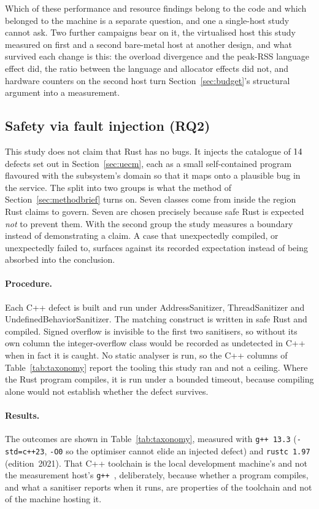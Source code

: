 \documentclass[english,oneside,a4paper,censored,csm,software-track-2020]{HYthesisML}
\begin{document}
Which of these performance and resource findings belong to the code and which belonged to the
machine is a separate question, and one a single-host study cannot ask.
Two further campaigns bear on it, the virtualised host this study measured on first and a second
bare-metal host at another design, and what survived each change is this: the overload divergence
and the peak-RSS language effect did, the ratio between the language and allocator effects did
not, and hardware counters on the second host turn Section~\ref{sec:budget}'s structural argument
into a measurement.

\subsection{Safety via fault injection (RQ2)}\label{sec:safetyresults}
This study does not claim that Rust has no bugs. It injects the catalogue of $14$
defects set out in Section~\ref{sec:uecm}, each as a small self-contained program flavoured
with the subsystem's domain so that it maps onto a plausible bug in the service. The split into
two groups is what the method of Section~\ref{sec:methodbrief} turns on. Seven classes come from
inside the region Rust claims to govern. Seven are chosen precisely because safe Rust is expected
\emph{not} to prevent them. With the second group the study measures a boundary instead of
demonstrating a claim. A case that unexpectedly compiled, or unexpectedly failed to, surfaces
against its recorded expectation instead of being absorbed into the conclusion.

\paragraph{Procedure.}
Each C++ defect is built and run under AddressSanitizer, ThreadSanitizer and
UndefinedBehaviorSanitizer. The matching construct is written in safe Rust and compiled.
Signed overflow is invisible to the first two sanitisers, so without its own column the
integer-overflow class would be recorded as undetected in C++ when in fact it is caught. No
static analyser is run, so the C++ columns of Table~\ref{tab:taxonomy} report the tooling this
study ran and not a ceiling. Where the Rust program compiles, it is run under a bounded timeout,
because compiling alone would not establish whether the defect survives.

\paragraph{Results.}
The outcomes are shown in Table~\ref{tab:taxonomy}, measured with \texttt{g++~13.3}
(\texttt{-std=c++23}, \texttt{-O0} so the optimiser cannot elide an injected defect) and
\texttt{rustc~1.97} (edition~2021). That C++ toolchain is the local development machine's and not
the measurement host's \texttt{g++~\MainGpp}, deliberately, because whether a program compiles,
and what a sanitiser reports when it runs, are properties of the toolchain and not of the machine
hosting it.
\end{document}
